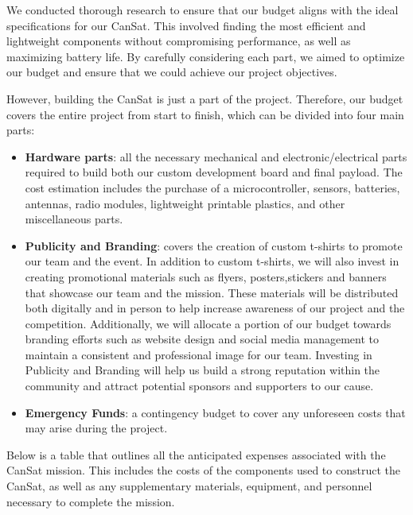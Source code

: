 We conducted thorough research to ensure that our budget aligns with the ideal specifications for our CanSat. This involved finding the most efficient and lightweight components without compromising performance, as well as maximizing battery life. By carefully considering each part, we aimed to optimize our budget and ensure that we could achieve our project objectives.

However, building the CanSat is just a part of the project. Therefore, our budget covers the entire project from start to finish, which can be divided into four main parts: 
\begin{itemize}[leftmargin=1cm, itemindent=0.25cm, noitemsep, topsep=0pt, label=$\bullet$]
    \item \textbf{Hardware parts}: all the necessary mechanical and electronic/electrical parts required to build both our custom development board and final payload. The cost estimation includes the purchase of a microcontroller, sensors, batteries, antennas, radio modules, lightweight printable plastics, and other miscellaneous parts.
    \item \textbf{Publicity and Branding}: covers the creation of custom t-shirts to promote our team and the event. In addition to custom t-shirts, we will also invest in creating promotional materials such as flyers, posters,stickers and banners that showcase our team and the mission. These materials will be distributed both digitally and in person to help increase awareness of our project and the competition. Additionally, we will allocate a portion of our budget towards branding efforts such as website design and social media management to maintain a consistent and professional image for our team. Investing in Publicity and Branding will help us build a strong reputation within the community and attract potential sponsors and supporters to our cause.
    \item \textbf{Emergency Funds}: a contingency budget to cover any unforeseen costs that may arise during the project.
\end{itemize}

Below is a table that outlines all the anticipated expenses associated with the CanSat mission. This includes the costs of the components used to construct the CanSat, as well as any supplementary materials, equipment, and personnel necessary to complete the mission.

